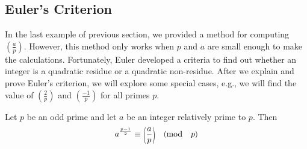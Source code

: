 \documentclass[main.tex]{subfile}
\begin{document}
	\subsection{Euler's Criterion}
	In the last example of previous section, we provided a method for computing $ \left(\frac{a}{p}\right)$. However, this method only works when $p$ and $a$ are small enough to make the calculations. Fortunately, Euler developed a criteria  to find out whether an integer is a quadratic residue or a quadratic non-residue. After we explain and prove Euler's criterion, we will explore some special cases, e.g., we will find the value of $ \left(\frac{2}{p}\right)$ and $ \left(\frac{-1}{p}\right)$ for all primes $p$.

	\begin{theorem}
		\label{thm:eulerscriterion}
		Let $p$ be an odd prime and let $a$ be an integer relatively prime to $p$. Then
		\begin{align*}
			a^{\frac{p-1}{2}} \equiv \parenthesis{\dfrac{a}{p}} \pmod p
		\end{align*}
	\end{theorem}
\end{document}
